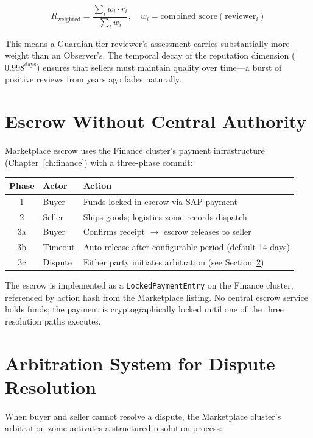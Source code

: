 \documentclass[12pt]{book}
\begin{document}
\begin{equation}
  R_{\text{weighted}} = \frac{\sum_{i} w_i \cdot r_i}{\sum_{i} w_i},
  \quad w_i = \text{combined\_score}(\text{reviewer}_i)
\end{equation}

This means a Guardian-tier reviewer's assessment carries substantially
more weight than an Observer's.  The temporal decay of the reputation
dimension ($0.998^{\text{days}}$) ensures that sellers must maintain
quality over time---a burst of positive reviews from years ago fades
naturally.

\section{Escrow Without Central Authority}

Marketplace escrow uses the Finance cluster's payment infrastructure
(Chapter~\ref{ch:finance}) with a three-phase commit:

\begin{longtable}{clp{7cm}}
\toprule
\textbf{Phase} & \textbf{Actor} & \textbf{Action} \\
\midrule
\endhead
1 & Buyer   & Funds locked in escrow via SAP payment \\
2 & Seller  & Ships goods; logistics zome records dispatch \\
3a & Buyer  & Confirms receipt $\rightarrow$ escrow releases to seller \\
3b & Timeout & Auto-release after configurable period (default 14 days) \\
3c & Dispute & Either party initiates arbitration (see Section~\ref{sec:arbitration}) \\
\bottomrule
\end{longtable}

The escrow is implemented as a \texttt{LockedPaymentEntry} on the
Finance cluster, referenced by action hash from the Marketplace
listing.  No central escrow service holds funds; the payment is
cryptographically locked until one of the three resolution paths
executes.

\section{Arbitration System for Dispute Resolution}
\label{sec:arbitration}

When buyer and seller cannot resolve a dispute, the Marketplace
cluster's arbitration zome activates a structured resolution process:
\end{document}
